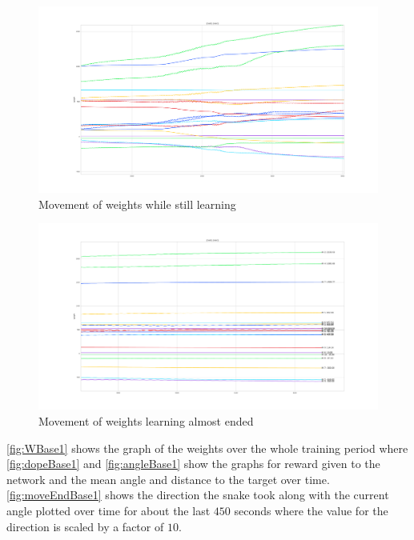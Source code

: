 \begin{figure}[htpb]
  \centering
  \includegraphics[width=\textwidth]{figures/plots/midWBase1}
  \caption{Movement of weights while still learning }
  \label{fig:midWBase1}
\end{figure}


\begin{figure}[htpb]
  \centering
  \includegraphics[width=\textwidth]{figures/plots/endWBase1}
  \caption{Movement of weights learning almost ended }
  \label{fig:endWBase1}
\end{figure}
\autoref{fig:WBase1} shows the graph of the weights over the whole training period where \autoref{fig:dopeBase1} and \autoref{fig:angleBase1} show the graphs for reward given to the network and the mean angle and distance to the target over time. \autoref{fig:moveEndBase1} shows the direction the snake took along with the current angle plotted over time for about the last $450$ seconds where the value for the direction is scaled by a factor of $10$.

